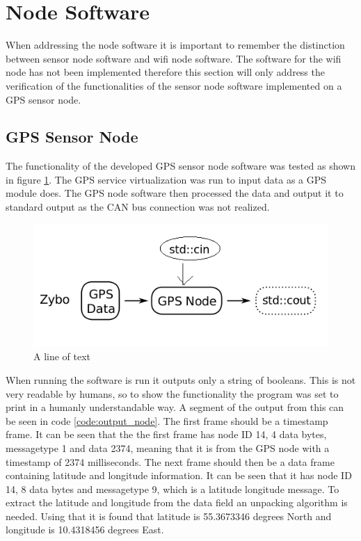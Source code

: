 \section{Node Software}
\label{sec:node_software}
When addressing the node software it is important to remember the distinction between sensor node software and wifi node software.
The software for the wifi node has not been implemented therefore this section will only address the verification of the functionalities of the sensor node software implemented on a GPS sensor node.

\subsection{GPS Sensor Node}
The functionality of the developed GPS sensor node software was tested as shown in figure \ref{fig:sensor_gps_veri}.
The GPS service virtualization was run to input data as a GPS module does. 
The GPS node software then processed the data and output it to standard output as the CAN bus connection was not realized.

\begin{figure}[h]
	\centering
	\includegraphics[width = 0.6\linewidth]{graphics/sensor_gps_veri}
	\caption{A line of text}
	\label{fig:sensor_gps_veri}
\end{figure}

When running the software is run it outputs only a string of booleans. 
This is not very readable by humans, so to show the functionality the program was set to print in a humanly understandable way.
A segment of the output from this can be seen in code \ref{code:output_node}.
The first frame should be a timestamp frame.
It can be seen that the the first frame has node ID 14, 4 data bytes, messagetype 1 and data 2374, meaning that it is from the GPS node with a timestamp of 2374 milliseconds.
The next frame should then be a data frame containing latitude and longitude information.
It can be seen that it has node ID 14, 8 data bytes and messagetype 9, which is a latitude longitude message.
To extract the latitude and longitude from the data field an unpacking algorithm is needed.
Using that it is found that latitude is 55.3673346 degrees North and longitude is 10.4318456 degrees East.

